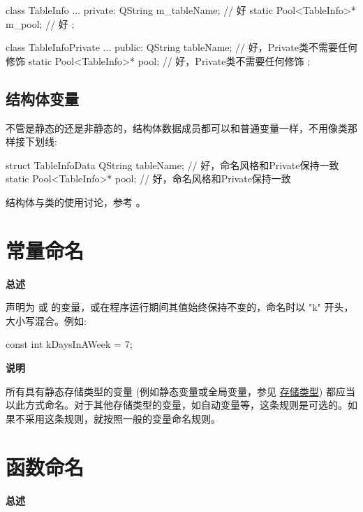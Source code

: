 \begin{cppcode}
  class TableInfo {
      ...
      private:
      QString m_tableName;               // 好
      static Pool<TableInfo>* m_pool;    // 好
    };

  class TableInfoPrivate {
      ...
      public:
      QString tableName;               // 好，Private类不需要任何修饰
      static Pool<TableInfo>* pool;    // 好，Private类不需要任何修饰
    };
\end{cppcode}

\subsection{结构体变量}

不管是静态的还是非静态的，结构体数据成员都可以和普通变量一样，不用像类那样接下划线:

\begin{cppcode}
  struct TableInfoData {
      QString tableName;               // 好，命名风格和Private保持一致
      static Pool<TableInfo>* pool;    // 好，命名风格和Private保持一致
    }
\end{cppcode}

结构体与类的使用讨论，参考 。

\section{常量命名} \label{constant-names}

\textbf{总述}

声明为  或  的变量，或在程序运行期间其值始终保持不变的，命名时以 "k" 开头，大小写混合。例如:

\begin{cppcode}
  const int kDaysInAWeek = 7;
\end{cppcode}

\textbf{说明}

所有具有静态存储类型的变量 (例如静态变量或全局变量，参见 \href{http://en.cppreference.com/w/cpp/language/storage_duration#Storage_duration}{存储类型}) 都应当以此方式命名。对于其他存储类型的变量，如自动变量等，这条规则是可选的。如果不采用这条规则，就按照一般的变量命名规则。

\section{函数命名} \label{function-names}

\textbf{总述}

